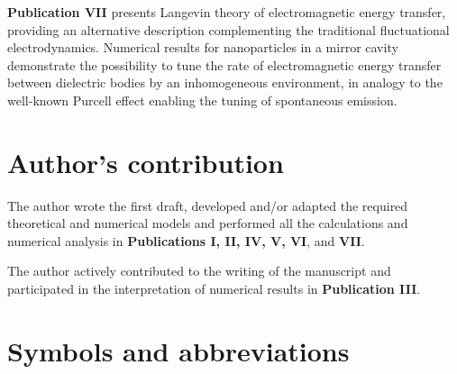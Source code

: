 \documentclass[dissertation,draft*]{aaltoseries}
\newcommand{\listofsymbols}{%
  \chapter*{Symbols and abbreviations}%
}
\begin{document}
\vspace{1cm}
\noindent
\textbf{Publication VII} presents Langevin theory of electromagnetic energy transfer, providing an alternative description complementing the traditional fluctuational electrodynamics. Numerical results for nanoparticles in a mirror cavity demonstrate the possibility to tune the rate of electromagnetic energy transfer between dielectric bodies by an inhomogeneous environment, in analogy to the well-known Purcell effect enabling the tuning of spontaneous emission.

\chapter*{Author's contribution}
The author wrote the first draft, developed and/or adapted the required theoretical and numerical models and performed all the calculations and numerical analysis in \textbf{Publications I, II, IV, V, VI}, and \textbf{VII}.

\vspace{1cm}
\noindent
The author actively contributed to the writing of the manuscript and participated in the interpretation of numerical results in \textbf{Publication III}.

\listofsymbols
{}
\end{document}
